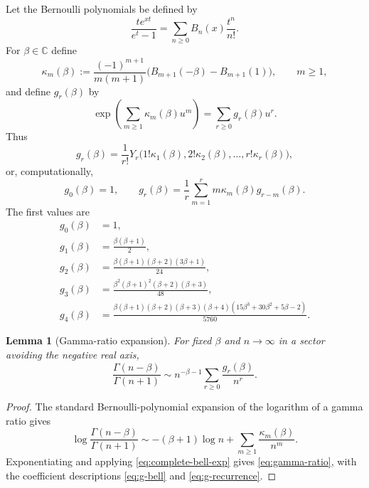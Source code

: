 \documentclass[11pt,oneside]{article}
\numberwithin{equation}{section}
\theoremstyle{plain}
\newtheorem{lemma}[theorem]{Lemma}
\theoremstyle{definition}
\theoremstyle{remark}
\newcommand{\C}{\mathbb C}
\begin{document}
Let the Bernoulli polynomials be defined by
\[
 \frac{te^{xt}}{e^t-1}=\sum_{n\ge0}B_n(x)\frac{t^n}{n!}.
\]
For $\beta\in\C$ define
\begin{equation}\label{eq:kappa-def}
 \kappa_m(\beta):=
 \frac{(-1)^{m+1}}{m(m+1)}
 \bigl(B_{m+1}(-\beta)-B_{m+1}(1)\bigr),\qquad m\ge1,
\end{equation}
and define $g_r(\beta)$ by
\begin{equation}\label{eq:g-def-exp}
 \exp\!\left(\sum_{m\ge1}\kappa_m(\beta)u^m\right)
 =\sum_{r\ge0}g_r(\beta)u^r.
\end{equation}
Thus
\begin{equation}\label{eq:g-bell}
 g_r(\beta)=\frac1{r!}
 Y_r\bigl(1!\kappa_1(\beta),2!\kappa_2(\beta),\ldots,
           r!\kappa_r(\beta)\bigr),
\end{equation}
or, computationally,
\begin{equation}\label{eq:g-recurrence}
 g_0(\beta)=1,\qquad
 g_r(\beta)=\frac1r\sum_{m=1}^{r}m\kappa_m(\beta)g_{r-m}(\beta).
\end{equation}
The first values are
\begin{align*}
 g_0(\beta)&=1,\\
 g_1(\beta)&=\frac{\beta(\beta+1)}2,\\
 g_2(\beta)&=\frac{\beta(\beta+1)(\beta+2)(3\beta+1)}{24},\\
 g_3(\beta)&=\frac{\beta^2(\beta+1)^2(\beta+2)(\beta+3)}{48},\\
 g_4(\beta)&=\frac{\beta(\beta+1)(\beta+2)(\beta+3)(\beta+4)
 (15\beta^3+30\beta^2+5\beta-2)}{5760}.
\end{align*}

\begin{lemma}[Gamma-ratio expansion]\label{lem:gamma-ratio}
For fixed $\beta$ and $n\to\infty$ in a sector avoiding the negative real
axis,
\begin{equation}\label{eq:gamma-ratio}
 \frac{\Gamma(n-\beta)}{\Gamma(n+1)}
 \sim n^{-\beta-1}\sum_{r\ge0}\frac{g_r(\beta)}{n^r}.
\end{equation}
\end{lemma}

\begin{proof}
The standard Bernoulli-polynomial expansion of the logarithm of a gamma
ratio gives
\[
 \log\frac{\Gamma(n-\beta)}{\Gamma(n+1)}
 \sim-(\beta+1)\log n+
 \sum_{m\ge1}\frac{\kappa_m(\beta)}{n^m}.
\]
Exponentiating and applying \eqref{eq:complete-bell-exp} gives
\eqref{eq:gamma-ratio}, with the coefficient descriptions
\eqref{eq:g-bell} and \eqref{eq:g-recurrence}.
\end{proof}
\end{document}
